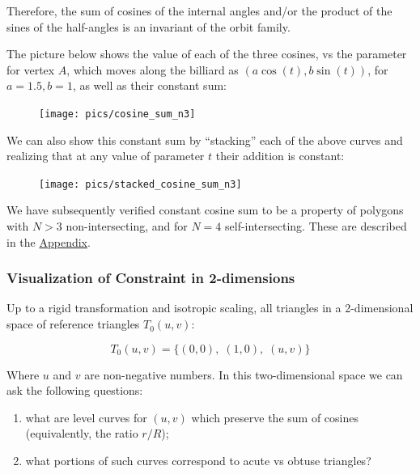 \documentclass[]{article}
\providecommand{\tightlist}{%
  \setlength{\itemsep}{0pt}\setlength{\parskip}{0pt}}
\begin{document}
Therefore, the sum of cosines of the internal angles and/or the product of the sines of the half-angles is an invariant of the orbit family.

The picture below shows the value of each of the three cosines, vs the parameter for vertex \(A\), which moves along the billiard as \((a\cos(t),b\sin(t))\), for \(a=1.5,b=1\), as well as their constant sum:

\begin{figure}[H]

{\centering \texttt{[image: pics/cosine\_sum\_n3]} 

}

\end{figure}

We can also show this constant sum by ``stacking'' each of the above curves and realizing that at any value of parameter \(t\) their addition is constant:

\begin{figure}[H]

{\centering \texttt{[image: pics/stacked\_cosine\_sum\_n3]} 

}

\end{figure}

We have subsequently verified constant cosine sum to be a property of polygons with \(N>3\) non-intersecting, and for \(N=4\) self-intersecting. These are described in the \href{appendices.html}{Appendix}.

\hypertarget{visualization-of-constraint-in-2-dimensions}{%
\subsubsection{Visualization of Constraint in 2-dimensions}\label{visualization-of-constraint-in-2-dimensions}}

Up to a rigid transformation and isotropic scaling, all triangles in a 2-dimensional space of reference triangles \(T_0(u,v)\):

\[
T_0(u,v)=\{(0,0),\;(1,0),\;(u,v)\}
\]

Where \(u\) and \(v\) are non-negative numbers. In this two-dimensional space we can ask the following questions:

\begin{enumerate}
\def\labelenumi{\arabic{enumi}.}
\tightlist
\item
  what are level curves for \((u,v)\) which preserve the sum of cosines (equivalently, the ratio \(r/R\));
\item
  what portions of such curves correspond to acute vs obtuse triangles?
\end{enumerate}
\end{document}
